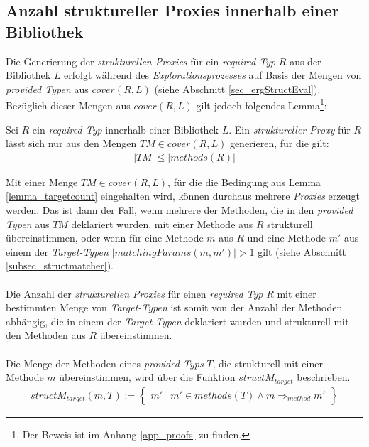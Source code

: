 \subsection{Anzahl struktureller Proxies innerhalb einer Bibliothek}\label{sec_anzahlProxies}
Die Generierung der \emph{strukturellen Proxies} für ein \emph{required Typ} $R$ aus der Bibliothek $L$ erfolgt während des \emph{Explorationsprozesses} auf Basis der Mengen von \emph{provided Typen} aus $\mathit{cover(R,L)}$ (siehe Abschnitt \ref{sec_ergStructEval}). Bezüglich dieser Mengen aus $\mathit{cover(R,L)}$ gilt jedoch folgendes Lemma\footnote{Der Beweis ist im Anhang \ref{app_proofs} zu finden.}:
\begin{lemma}\label{lemma_targetcount}
Sei $R$ ein \emph{required Typ} innerhalb einer Bibliothek $L$. 
Ein \emph{struktureller Proxy} für $R$ lässt sich nur aus den Mengen $\mathit{TM} \in \mathit{cover(R,L)}$ generieren, für die gilt:
\begin{gather*}
|\mathit{TM}| \leq |\mathit{methods(R)}|
\end{gather*}
\end{lemma}
\noindent
Mit einer Menge $\mathit{TM} \in \mathit{cover(R,L)}$, für die die Bedingung aus Lemma \ref{lemma_targetcount} eingehalten wird, können durchaus mehrere \emph{Proxies} erzeugt werden. Das ist dann der Fall, wenn mehrere der Methoden, die in den \emph{provided Typen} aus $\mathit{TM}$ deklariert wurden, mit einer Methode aus $R$ strukturell übereinstimmen, oder wenn für eine Methode $m$ aus $R$ und eine Methode $m'$ aus einem der \emph{Target-Typen} $|matchingParams(m,m')| > 1$ gilt (siehe Abschnitt \ref{subsec_structmatcher}).
\\\\
Die Anzahl der \emph{strukturellen Proxies} für einen \emph{required Typ} $R$ mit einer bestimmten Menge von \emph{Target-Typen} ist somit von der Anzahl der Methoden abhängig, die in einem der \emph{Target-Typen} deklariert wurden und strukturell mit den Methoden aus $R$ übereinstimmen. 
\\\\
Die Menge der Methoden eines \emph{provided Typs} $T$, die strukturell mit einer Methode $m$ übereinstimmen, wird über die Funktion $\mathit{structM_{target}}$ beschrieben.
\begin{gather*}
\mathit{structM_{target}(m, T)} := 
\left\{\begin{array}{l|l}
m'	& m' \in \mathit{methods(T)} \wedge  m \Rightarrow_{method} m'
\end{array}
\right\}
\end{gather*}
